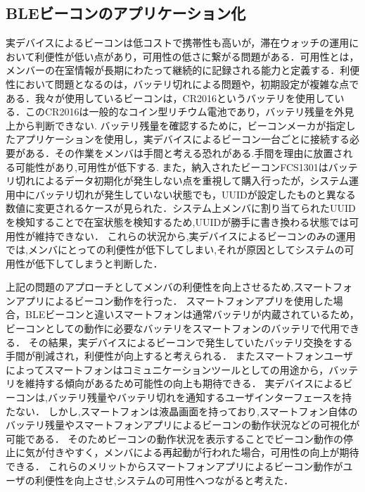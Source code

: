 


\subsection{ BLEビーコンのアプリケーション化}




実デバイスによるビーコンは低コストで携帯性も高いが，滞在ウォッチの運用において利便性が低い点があり，可用性の低さに繋がる問題がある．可用性とは，メンバーの在室情報が長期にわたって継続的に記録される能力と定義する．利便性において問題となるのは，バッテリ切れによる問題や，初期設定が複雑な点である．我々が使用しているビーコンは，CR2016というバッテリを使用している．このCR2016は一般的なコイン型リチウム電池であり，バッテリ残量を外見上から判断できない.
バッテリ残量を確認するために，ビーコンメーカが指定したアプリケーションを使用し，実デバイスによるビーコン一台ごとに接続する必要がある．その作業をメンバは手間と考える恐れがある.手間を理由に放置される可能性があり,可用性が低下する.
また，納入されたビーコンFCS1301はバッテリ切れによるデータ初期化が発生しない点を重視して購入行ったが，システム運用中にバッテリ切れが発生していない状態でも，UUIDが設定したものと異なる数値に変更されるケースが見られた．システム上メンバに割り当てられたUUIDを検知することで在室状態を検知するため,UUIDが勝手に書き換わる状態では可用性が維持できない．
これらの状況から,実デバイスによるビーコンのみの運用では,メンバにとっての利便性が低下してしまい,それが原因としてシステムの可用性が低下してしまうと判断した．


上記の問題のアプローチとしてメンバの利便性を向上させるため,スマートフォンアプリによるビーコン動作を行った．
スマートフォンアプリを使用した場合，BLEビーコンと違いスマートフォンは通常バッテリが内蔵されているため，ビーコンとしての動作に必要なバッテリをスマートフォンのバッテリで代用できる．
その結果，実デバイスによるビーコンで発生していたバッテリ交換をする手間が削減され，利便性が向上すると考えられる．
またスマートフォンユーザによってスマートフォンはコミュニケーションツールとしての用途から，バッテリを維持する傾向があるため可能性の向上も期待できる．
実デバイスによるビーコンは,バッテリ残量やバッテリ切れを通知するユーザインターフェースを持たない．
しかし,スマートフォンは液晶画面を持っており,スマートフォン自体のバッテリ残量やスマートフォンアプリによるビーコンの動作状況などの可視化が可能である．
そのためビーコンの動作状況を表示することでビーコン動作の停止に気が付きやすく，メンバによる再起動が行われた場合，可用性の向上が期待できる．
これらのメリットからスマートフォンアプリによるビーコン動作がユーザの利便性を向上させ,システムの可用性へつながると考えた．


